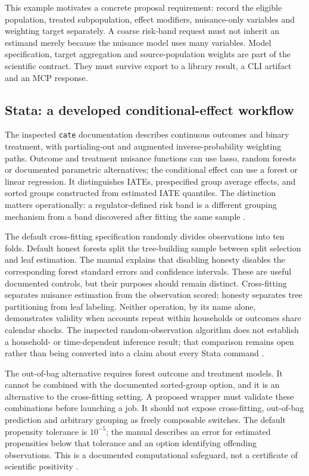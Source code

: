 This example motivates a concrete proposal requirement: record the eligible
population, treated subpopulation, effect modifiers, nuisance-only variables
and weighting target separately. A coarse risk-band request must not inherit
an estimand merely because the nuisance model uses many variables. Model
specification, target aggregation and source-population weights are part of
the scientific contract. They must survive export to a library result, a CLI
artifact and an MCP response.

\subsection{Stata: a developed conditional-effect workflow}

The inspected \texttt{cate} documentation describes continuous outcomes and
binary treatment, with partialing-out and augmented inverse-probability
weighting paths. Outcome and treatment nuisance functions can use lasso,
random forests or documented parametric alternatives; the conditional effect
can use a forest or linear regression. It distinguishes IATEs, prespecified
group average effects, and sorted groups constructed from estimated IATE
quantiles. The distinction matters operationally: a regulator-defined risk
band is a different grouping mechanism from a band discovered after fitting
the same sample \cite{exec13_ch_stata}.

The default cross-fitting specification randomly divides observations into
ten folds. Default honest forests split the tree-building sample between
split selection and leaf estimation. The manual explains that disabling
honesty disables the corresponding forest standard errors and confidence
intervals. These are useful documented controls, but their purposes should
remain distinct. Cross-fitting separates nuisance estimation from the
observation scored; honesty separates tree partitioning from leaf labeling.
Neither operation, by its name alone, demonstrates validity when accounts
repeat within households or outcomes share calendar shocks. The inspected
random-observation algorithm does not establish a household- or
time-dependent inference result; that comparison remains open rather than
being converted into a claim about every Stata command
\cite{exec13_ch_stata}.

The out-of-bag alternative requires forest outcome and treatment models.
It cannot be combined with the documented sorted-group option, and it is
an alternative to the cross-fitting setting. A proposed wrapper must
validate these combinations before launching a job. It should not expose
cross-fitting, out-of-bag prediction and arbitrary grouping as freely
composable switches. The default propensity tolerance is $10^{-5}$; the
manual describes an error for estimated propensities below that tolerance
and an option identifying offending observations. This is a documented
computational safeguard, not a certificate of scientific positivity
\cite{exec13_ch_stata}.

